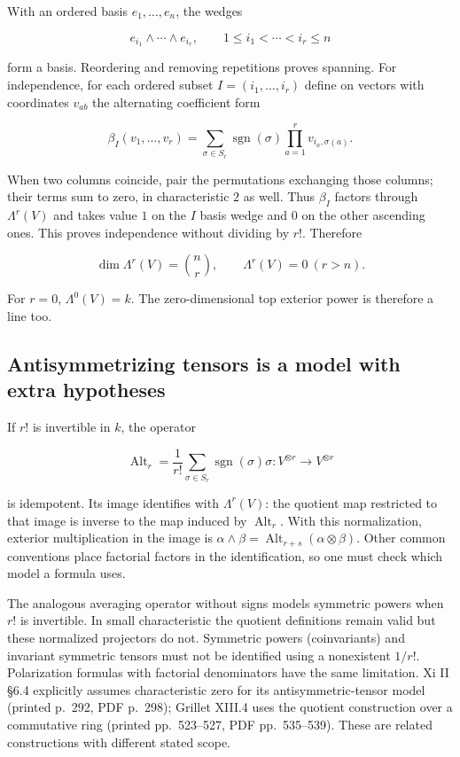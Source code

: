 \documentclass[
  11pt,
]{article}
\begin{document}
With an ordered basis \(e_1,\ldots,e_n\), the wedges

\[e_{i_1}\wedge\cdots\wedge e_{i_r},\qquad
1\le i_1<\cdots<i_r\le n\]

form a basis. Reordering and removing repetitions proves spanning. For
independence, for each ordered subset \(I=(i_1,\ldots,i_r)\) define on
vectors with coordinates \(v_{ab}\) the alternating coefficient form

\[\beta_I(v_1,\ldots,v_r)
=\sum_{\sigma\in S_r}\operatorname{sgn}(\sigma)
\prod_{a=1}^r v_{i_a,\sigma(a)}.\]

When two columns coincide, pair the permutations exchanging those
columns; their terms sum to zero, in characteristic \(2\) as well. Thus
\(\beta_I\) factors through \(\Lambda^r(V)\) and takes value \(1\) on
the \(I\) basis wedge and \(0\) on the other ascending ones. This proves
independence without dividing by \(r!\). Therefore

\[\dim\Lambda^r(V)=\binom nr,\qquad\Lambda^r(V)=0\ (r>n).\]

For \(r=0\), \(\Lambda^0(V)=k\). The zero-dimensional top exterior power
is therefore a line too.

\subsection{Antisymmetrizing tensors is a model with extra
hypotheses}\label{antisymmetrizing-tensors-is-a-model-with-extra-hypotheses}

If \(r!\) is invertible in \(k\), the operator

\[\operatorname{Alt}_r
=\frac1{r!}\sum_{\sigma\in S_r}\operatorname{sgn}(\sigma)\sigma
:V^{\otimes r}\to V^{\otimes r}\]

is idempotent. Its image identifies with \(\Lambda^r(V)\): the quotient
map restricted to that image is inverse to the map induced by
\(\operatorname{Alt}_r\). With this normalization, exterior
multiplication in the image is
\(\alpha\wedge\beta=\operatorname{Alt}_{r+s}(\alpha\otimes\beta)\).
Other common conventions place factorial factors in the identification,
so one must check which model a formula uses.

The analogous averaging operator without signs models symmetric powers
when \(r!\) is invertible. In small characteristic the quotient
definitions remain valid but these normalized projectors do not.
Symmetric powers (coinvariants) and invariant symmetric tensors must not
be identified using a nonexistent \(1/r!\). Polarization formulas with
factorial denominators have the same limitation. Xi II §6.4 explicitly
assumes characteristic zero for its antisymmetric-tensor model (printed
p.~292, PDF p.~298); Grillet XIII.4 uses the quotient construction over
a commutative ring (printed pp.~523--527, PDF pp.~535--539). These are
related constructions with different stated scope.
\end{document}

